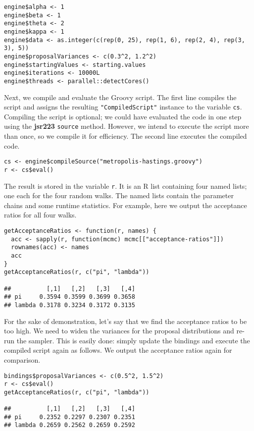 \documentclass[
article,
11pt, %
a4paper, %
oneside, %
headinclude,footinclude, %
]{scrartcl}
\theoremstyle{definition} %
\theoremstyle{plain} %
\theoremstyle{remark} %
\newcommand{\pkg}[1]{\textbf{#1}}
\newcommand{\code}[1]{\texttt{#1}}
\begin{document}
\begin{verbatim}
engine$alpha <- 1
engine$beta <- 1
engine$theta <- 2
engine$kappa <- 1
engine$data <- as.integer(c(rep(0, 25), rep(1, 6), rep(2, 4), rep(3, 3), 5))
engine$proposalVariances <- c(0.3^2, 1.2^2)
engine$startingValues <- starting.values
engine$iterations <- 10000L
engine$threads <- parallel::detectCores()
\end{verbatim}

Next, we compile and evaluate the Groovy script. The first line compiles the script and assigns the resulting \code{"CompiledScript"} instance to the variable \code{cs}. Compiling the script is optional; we could have evaluated the code in one step using the \pkg{jsr223} \code{source} method. However, we intend to execute the script more than once, so we compile it for efficiency. The second line executes the compiled code.

\begin{verbatim}
cs <- engine$compileSource("metropolis-hastings.groovy")
r <- cs$eval()
\end{verbatim}

The result is stored in the variable \code{r}. It is an R list containing four named lists; one each for the four random walks. The named lists contain the parameter chains and some runtime statistics. For example, here we output the acceptance ratios for all four walks.

\begin{verbatim}
getAcceptanceRatios <- function(r, names) {
  acc <- sapply(r, function(mcmc) mcmc[["acceptance-ratios"]])
  rownames(acc) <- names
  acc
}
getAcceptanceRatios(r, c("pi", "lambda"))

##          [,1]   [,2]   [,3]   [,4]
## pi     0.3594 0.3599 0.3699 0.3658
## lambda 0.3178 0.3234 0.3172 0.3135
\end{verbatim}

For the sake of demonstration, let's say that we find the acceptance ratios to be too high. We need to widen the variances for the proposal distributions and re-run the sampler. This is easily done: simply update the bindings and execute the compiled script again as follows. We output the acceptance ratios again for comparison.

\begin{verbatim}
bindings$proposalVariances <- c(0.5^2, 1.5^2)
r <- cs$eval()
getAcceptanceRatios(r, c("pi", "lambda"))

##          [,1]   [,2]   [,3]   [,4]
## pi     0.2352 0.2297 0.2307 0.2351
## lambda 0.2659 0.2562 0.2659 0.2592
\end{verbatim}
\end{document}
